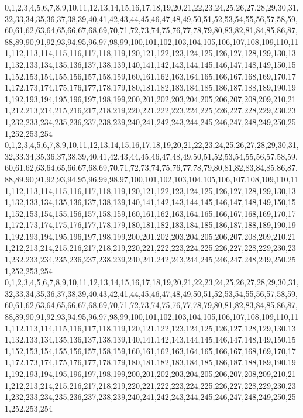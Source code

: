 \documentclass[12pt]{article}
\begin{document}
{0,1,2,3,4,5,6,7,8,9,10,11,12,13,14,15,16,17,18,19,20,21,22,23,24,25,26,27,28,29,30,31,32,33,34,35,36,37,38,39,40,41,42,43,44,45,46,47,48,49,50,51,52,53,54,55,56,57,58,59,60,61,62,63,64,65,66,67,68,69,70,71,72,73,74,75,76,77,78,79,80,83,82,81,84,85,86,87,88,89,90,91,92,93,94,95,96,97,98,99,100,101,102,103,104,105,106,107,108,109,110,111,112,113,114,115,116,117,118,119,120,121,122,123,124,125,126,127,128,129,130,131,132,133,134,135,136,137,138,139,140,141,142,143,144,145,146,147,148,149,150,151,152,153,154,155,156,157,158,159,160,161,162,163,164,165,166,167,168,169,170,171,172,173,174,175,176,177,178,179,180,181,182,183,184,185,186,187,188,189,190,191,192,193,194,195,196,197,198,199,200,201,202,203,204,205,206,207,208,209,210,211,212,213,214,215,216,217,218,219,220,221,222,223,224,225,226,227,228,229,230,231,232,233,234,235,236,237,238,239,240,241,242,243,244,245,246,247,248,249,250,251,252,253,254\\
0,1,2,3,4,5,6,7,8,9,10,11,12,13,14,15,16,17,18,19,20,21,22,23,24,25,26,27,28,29,30,31,32,33,34,35,36,37,38,39,40,41,42,43,44,45,46,47,48,49,50,51,52,53,54,55,56,57,58,59,60,61,62,63,64,65,66,67,68,69,70,71,72,73,74,75,76,77,78,79,80,81,82,83,84,85,86,87,88,89,90,91,92,93,94,95,96,99,98,97,100,101,102,103,104,105,106,107,108,109,110,111,112,113,114,115,116,117,118,119,120,121,122,123,124,125,126,127,128,129,130,131,132,133,134,135,136,137,138,139,140,141,142,143,144,145,146,147,148,149,150,151,152,153,154,155,156,157,158,159,160,161,162,163,164,165,166,167,168,169,170,171,172,173,174,175,176,177,178,179,180,181,182,183,184,185,186,187,188,189,190,191,192,193,194,195,196,197,198,199,200,201,202,203,204,205,206,207,208,209,210,211,212,213,214,215,216,217,218,219,220,221,222,223,224,225,226,227,228,229,230,231,232,233,234,235,236,237,238,239,240,241,242,243,244,245,246,247,248,249,250,251,252,253,254\\
0,1,2,3,4,5,6,7,8,9,10,11,12,13,14,15,16,17,18,19,20,21,22,23,24,25,26,27,28,29,30,31,32,33,34,35,36,37,38,39,40,43,42,41,44,45,46,47,48,49,50,51,52,53,54,55,56,57,58,59,60,61,62,63,64,65,66,67,68,69,70,71,72,73,74,75,76,77,78,79,80,81,82,83,84,85,86,87,88,89,90,91,92,93,94,95,96,97,98,99,100,101,102,103,104,105,106,107,108,109,110,111,112,113,114,115,116,117,118,119,120,121,122,123,124,125,126,127,128,129,130,131,132,133,134,135,136,137,138,139,140,141,142,143,144,145,146,147,148,149,150,151,152,153,154,155,156,157,158,159,160,161,162,163,164,165,166,167,168,169,170,171,172,173,174,175,176,177,178,179,180,181,182,183,184,185,186,187,188,189,190,191,192,193,194,195,196,197,198,199,200,201,202,203,204,205,206,207,208,209,210,211,212,213,214,215,216,217,218,219,220,221,222,223,224,225,226,227,228,229,230,231,232,233,234,235,236,237,238,239,240,241,242,243,244,245,246,247,248,249,250,251,252,253,254\\
}
\end{document}
